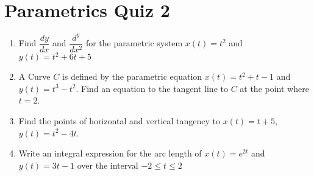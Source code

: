 \documentclass[12pt
]{article}
\author{}
\date{}
\begin{document}
\thispagestyle{empty}
\hypertarget{parametrics-quiz-2}{%
\section{Parametrics Quiz 2}\label{parametrics-quiz-2}}

\begin{enumerate}
\def\labelenumi{\arabic{enumi}.}
\def\itemsep{2in}
\item
  Find \(\dfrac{dy}{dx}\) and \(\dfrac{d^y}{dx^2}\) for the parametric
  system \(x(t)=t^2\) and \(y(t) = t^2+6t+5\)
\item
  A Curve \(C\) is defined by the parametric equation \(x(t) = t^2+t-1\)
  and \(y(t) = t^3-t^2\). Find an equation to the tangent line to \(C\)
  at the point where \(t=2\).
\item
  Find the points of horizontal and vertical tangency to \(x(t)=t+5\),
  \(y(t) = t^2-4t\).
\item
  Write an integral expression for the arc length of \(x(t) = e^{2t}\)
  and \(y(t) = 3t-1\) over the interval \(-2 \leq t \leq 2\)
\end{enumerate}
\end{document}
